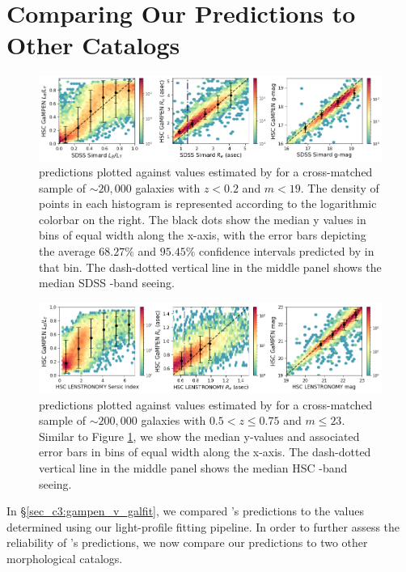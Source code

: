 \section{Comparing Our Predictions to Other Catalogs} \label{sec_c3:compare}

\begin{figure}[htb]
    \centering
    \includegraphics[width = \textwidth]{gampen_v_simard.png}
    \caption{\gampen{} predictions plotted against values estimated by \citet{simard_11} for a cross-matched sample of $\sim20,000$ galaxies with $z < 0.2$ and $m < 19$. The density of points in each histogram is represented according to the logarithmic colorbar on the right. The black dots show the median y values in bins of equal width along the x-axis, with the error bars depicting the average $68.27\%$ and $95.45\%$ confidence intervals predicted by \gampen{} in that bin. The dash-dotted vertical line in the middle panel shows the median SDSS \gb{}-band seeing.}
    \label{fig_c3:gampen_v_simard}
\end{figure}

\begin{figure}[htb]
    \centering
    \includegraphics[width = \textwidth]{gampen_v_lenstronomy.png}
    \caption{\gampen{} predictions plotted against values estimated by \citet{hsc_mass_size} for a cross-matched sample of $\sim200,000$ galaxies with $0.5 < z \leq 0.75$ and $m \leq 23$. Similar to Figure \ref{fig_c3:gampen_v_simard}, we show the median y-values and associated error bars in bins of equal width along the x-axis. The dash-dotted vertical line in the middle panel shows the median HSC \ib{}-band seeing.}
    \label{fig_c3:gampen_v_lenstronomy}
\end{figure}

In \S \ref{sec_c3:gampen_v_galfit}, we compared \gampen{}'s predictions to the values determined using our light-profile fitting pipeline. In order to further assess the reliability of \gampen{}'s predictions, we now compare our predictions to two other morphological catalogs. 

